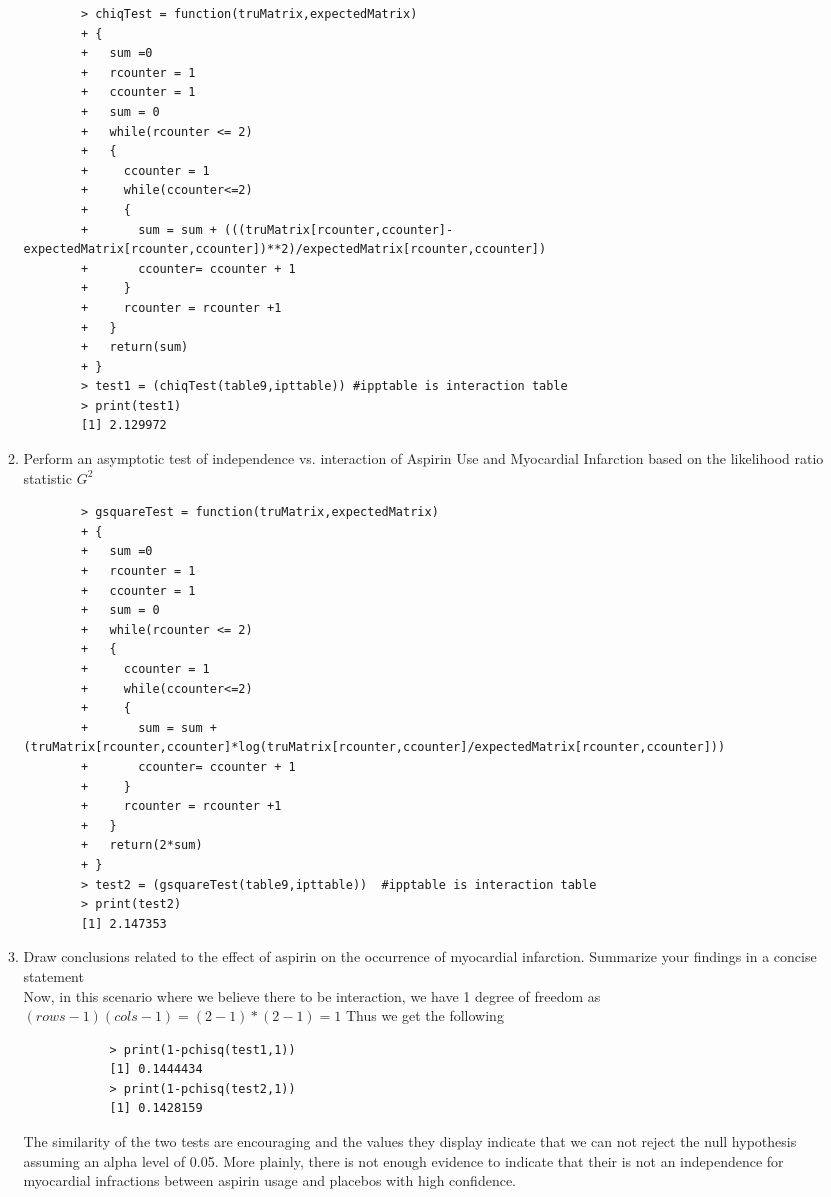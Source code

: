 \documentclass[11pt]{article}
\begin{document}
\begin{enumerate}
\begin{enumerate}
	\begin{verbatim}
		> chiqTest = function(truMatrix,expectedMatrix)
		+ {
		+   sum =0
		+   rcounter = 1
		+   ccounter = 1
		+   sum = 0
		+   while(rcounter <= 2)
		+   {
		+     ccounter = 1
		+     while(ccounter<=2)
		+     {
		+       sum = sum + (((truMatrix[rcounter,ccounter]-expectedMatrix[rcounter,ccounter])**2)/expectedMatrix[rcounter,ccounter])
		+       ccounter= ccounter + 1
		+     }
		+     rcounter = rcounter +1
		+   }
		+   return(sum)
		+ }
		> test1 = (chiqTest(table9,ipttable)) #ipptable is interaction table
		> print(test1)
		[1] 2.129972
	\end{verbatim}
	\item Perform an asymptotic test of independence vs. interaction of Aspirin Use and Myocardial Infarction based on the likelihood ratio statistic $G^2$
	\begin{verbatim}
		> gsquareTest = function(truMatrix,expectedMatrix)
		+ {
		+   sum =0
		+   rcounter = 1
		+   ccounter = 1
		+   sum = 0
		+   while(rcounter <= 2)
		+   {
		+     ccounter = 1
		+     while(ccounter<=2)
		+     {
		+       sum = sum + (truMatrix[rcounter,ccounter]*log(truMatrix[rcounter,ccounter]/expectedMatrix[rcounter,ccounter]))
		+       ccounter= ccounter + 1
		+     }
		+     rcounter = rcounter +1
		+   }
		+   return(2*sum)
		+ }
		> test2 = (gsquareTest(table9,ipttable))  #ipptable is interaction table
		> print(test2)
		[1] 2.147353
	\end{verbatim}
	\item Draw conclusions related to the effect of aspirin on the occurrence of myocardial infarction. Summarize your findings in a concise statement\\
		Now, in this scenario where we believe there to be interaction, we have 1 degree of freedom as $(rows-1)(cols-1) = (2-1)*(2-1)=1$ Thus we get the following
		\begin{verbatim}
			> print(1-pchisq(test1,1))
			[1] 0.1444434
			> print(1-pchisq(test2,1))
			[1] 0.1428159
		\end{verbatim}
		The similarity of the two tests are encouraging and the values they display indicate that we can not reject the null hypothesis assuming an alpha level of 0.05. More plainly, there is not enough evidence to indicate that their is not an independence for myocardial infractions between aspirin usage and placebos with high confidence.
\end{enumerate}
\end{enumerate}
\end{document}
